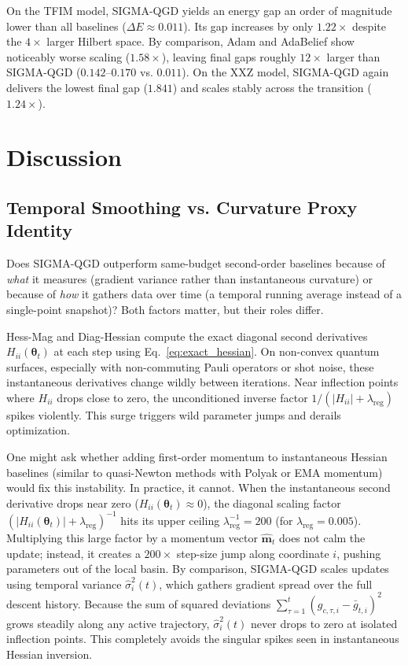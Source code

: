 \documentclass[11pt,a4paper]{article}
\begin{document}
On the TFIM model, SIGMA-QGD yields an energy gap an order of magnitude lower than all baselines ($\Delta E \approx 0.011$). Its gap increases by only $1.22\times$ despite the $4\times$ larger Hilbert space. By comparison, Adam and AdaBelief show noticeably worse scaling ($1.58\times$), leaving final gaps roughly $12\times$ larger than SIGMA-QGD ($0.142\text{--}0.170$ vs. $0.011$). On the XXZ model, SIGMA-QGD again delivers the lowest final gap ($1.841$) and scales stably across the transition ($1.24\times$).

\section{Discussion}
\label{sec:discussion}

\subsection{Temporal Smoothing vs. Curvature Proxy Identity}
Does SIGMA-QGD outperform same-budget second-order baselines because of \emph{what} it measures (gradient variance rather than instantaneous curvature) or because of \emph{how} it gathers data over time (a temporal running average instead of a single-point snapshot)? Both factors matter, but their roles differ.

Hess-Mag and Diag-Hessian compute the exact diagonal second derivatives $H_{ii}(\boldsymbol{\theta}_t)$ at each step using Eq.~\eqref{eq:exact_hessian}. On non-convex quantum surfaces, especially with non-commuting Pauli operators or shot noise, these instantaneous derivatives change wildly between iterations. Near inflection points where $H_{ii}$ drops close to zero, the unconditioned inverse factor $1/(|H_{ii}| + \lambda_{\text{reg}})$ spikes violently. This surge triggers wild parameter jumps and derails optimization.

One might ask whether adding first-order momentum to instantaneous Hessian baselines (similar to quasi-Newton methods with Polyak or EMA momentum) would fix this instability. In practice, it cannot. When the instantaneous second derivative drops near zero ($H_{ii}(\boldsymbol{\theta}_t) \approx 0$), the diagonal scaling factor $(|H_{ii}(\boldsymbol{\theta}_t)| + \lambda_{\text{reg}})^{-1}$ hits its upper ceiling $\lambda_{\text{reg}}^{-1} = 200$ (for $\lambda_{\text{reg}} = 0.005$). Multiplying this large factor by a momentum vector $\hat{\mathbf{m}}_t$ does not calm the update; instead, it creates a $200\times$ step-size jump along coordinate $i$, pushing parameters out of the local basin. By comparison, SIGMA-QGD scales updates using temporal variance $\hat{\sigma}_i^2(t)$, which gathers gradient spread over the full descent history. Because the sum of squared deviations $\sum_{\tau=1}^t (g_{c,\tau,i} - \bar{g}_{t,i})^2$ grows steadily along any active trajectory, $\hat{\sigma}_i^2(t)$ never drops to zero at isolated inflection points. This completely avoids the singular spikes seen in instantaneous Hessian inversion.
\end{document}
